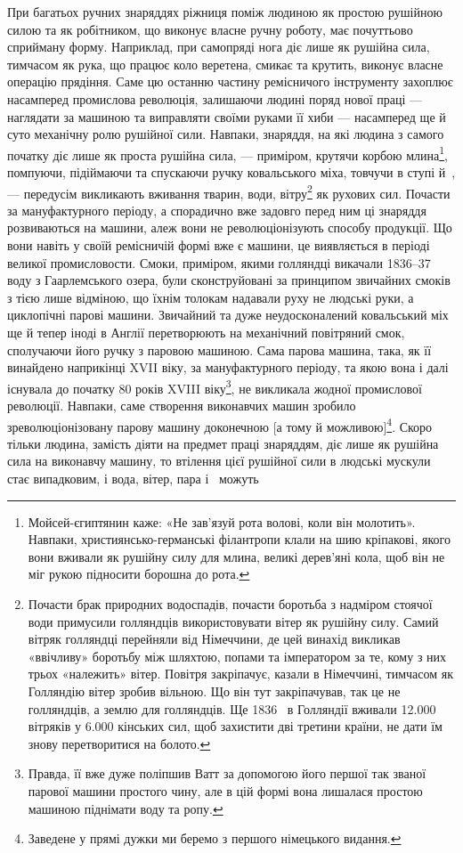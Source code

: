 
При багатьох ручних знаряддях ріжниця поміж людиною як
простою рушійною силою та як робітником, що виконує власне
ручну роботу, має почуттьово сприйману форму. Наприклад,
при самопряді нога діє лише як рушійна сила, тимчасом як рука,
що працює коло веретена, смикає та крутить, виконує власне
операцію прядіння. Саме цю останню частину ремісничого інструменту
захоплює насамперед промислова революція, залишаючи
людині поряд нової праці — наглядати за машиною та виправляти
своїми руками її хиби — насамперед ще й суто механічну ролю
рушійної сили. Навпаки, знаряддя, на які людина з самого початку
діє лише як проста рушійна сила, — приміром, крутячи корбою
млина\footnote{
Мойсей-єгиптянин каже: «Не зав’язуй рота волові, коли він молотить».
Навпаки, християнсько-германські філантропи клали на шию
кріпакові, якого вони вживали як рушійну силу для млина, великі дерев’яні
кола, щоб він не міг рукою підносити борошна до рота.
}, помпуючи, підіймаючи та спускаючи ручку ковальського
міха, товчучи в ступі й~, — передусім викликають вживання
тварин, води, вітру\footnote{
Почасти брак природних водоспадів, почасти боротьба з надміром
стоячої води примусили голляндців використовувати вітер як рушійну
силу. Самий вітряк голляндці перейняли від Німеччини, де цей винахід
викликав «ввічливу» боротьбу між шляхтою, попами та імператором за те,
кому з них трьох «належить» вітер. Повітря закріпачує, казали в Німеччині,
тимчасом як Голляндію вітер зробив вільною. Що він тут закріпачував,
так це не голляндців, а землю для голляндців. Ще 1836~
в Голляндії вживали \num{12.000} вітряків у \num{6.000} кінських сил, щоб захистити
дві третини країни, не дати їм знову перетворитися на болото.
} як рухових сил. Почасти за мануфактурного
періоду, а спорадично вже задовго перед ним ці знаряддя
розвиваються на машини, алеж вони не революціонізують способу
продукції. Що вони навіть у своїй ремісничій формі вже є
машини, це виявляється в періоді великої промисловости. Смоки,
приміром, якими голляндці викачали 1836--37~ воду з Гаарлемського
озера, були сконструйовані за принципом звичайних
смоків з тією лише відміною, що їхнім толокам надавали руху не
людські руки, а циклопічні парові машини. Звичайний та дуже
неудосконалений ковальський міх ще й тепер іноді в Англії перетворюють
на механічний повітряний смок, сполучаючи його
ручку з паровою машиною. Сама парова машина, така, як її
винайдено наприкінці XVII віку, за мануфактурного періоду,
та якою вона і далі існувала до початку 80 років XVIII віку\footnote{
Правда, її вже дуже поліпшив Ватт за допомогою його першої
так званої парової машини простого чину, але в цій формі вона лишалася
простою машиною піднімати воду та ропу.
},
не викликала жодної промислової революції. Навпаки, саме створення
виконавчих машин зробило зреволюціонізовану парову
машину доконечною [а тому й можливою]\footnote*{
Заведене у прямі дужки ми беремо з першого німецького видання.
}. Скоро тільки людина,
замість діяти на предмет праці знаряддям, діє лише як рушійна
сила на виконавчу машину, то втілення цієї рушійної сили в
людські мускули стає випадковим, і вода, вітер, пара і~ можуть
\parbreak{}  %
